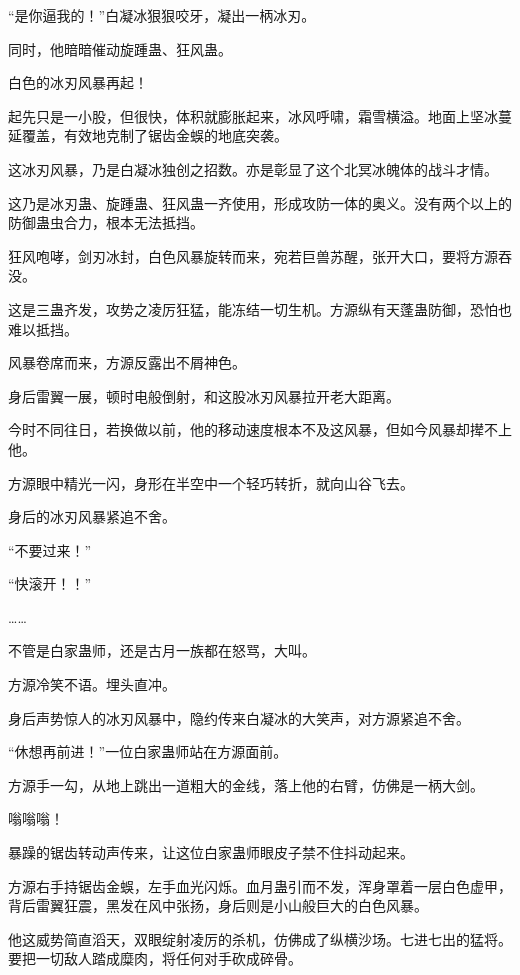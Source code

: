 
\begin{this_body}



“是你逼我的！”白凝冰狠狠咬牙，凝出一柄冰刃。

同时，他暗暗催动旋踵蛊、狂风蛊。

白色的冰刃风暴再起！

起先只是一小股，但很快，体积就膨胀起来，冰风呼啸，霜雪横溢。地面上坚冰蔓延覆盖，有效地克制了锯齿金蜈的地底突袭。

这冰刃风暴，乃是白凝冰独创之招数。亦是彰显了这个北冥冰魄体的战斗才情。

这乃是冰刃蛊、旋踵蛊、狂风蛊一齐使用，形成攻防一体的奥义。没有两个以上的防御蛊虫合力，根本无法抵挡。

狂风咆哮，剑刃冰封，白色风暴旋转而来，宛若巨兽苏醒，张开大口，要将方源吞没。

这是三蛊齐发，攻势之凌厉狂猛，能冻结一切生机。方源纵有天蓬蛊防御，恐怕也难以抵挡。

风暴卷席而来，方源反露出不屑神色。

身后雷翼一展，顿时电般倒射，和这股冰刃风暴拉开老大距离。

今时不同往日，若换做以前，他的移动速度根本不及这风暴，但如今风暴却撵不上他。

方源眼中精光一闪，身形在半空中一个轻巧转折，就向山谷飞去。

身后的冰刃风暴紧追不舍。

“不要过来！”

“快滚开！！”

……

不管是白家蛊师，还是古月一族都在怒骂，大叫。

方源冷笑不语。埋头直冲。

身后声势惊人的冰刃风暴中，隐约传来白凝冰的大笑声，对方源紧追不舍。

“休想再前进！”一位白家蛊师站在方源面前。

方源手一勾，从地上跳出一道粗大的金线，落上他的右臂，仿佛是一柄大剑。

嗡嗡嗡！

暴躁的锯齿转动声传来，让这位白家蛊师眼皮子禁不住抖动起来。

方源右手持锯齿金蜈，左手血光闪烁。血月蛊引而不发，浑身罩着一层白色虚甲，背后雷翼狂震，黑发在风中张扬，身后则是小山般巨大的白色风暴。

他这威势简直滔天，双眼绽射凌厉的杀机，仿佛成了纵横沙场。七进七出的猛将。要把一切敌人踏成糜肉，将任何对手砍成碎骨。


\end{this_body}

